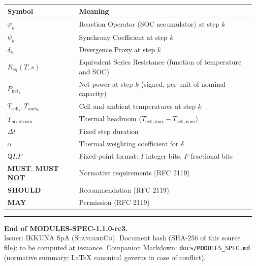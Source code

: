 \documentclass[11pt,letterpaper]{article}
\theoremstyle{definition}
\newcommand{\StandardCo}{\textsc{StandardCo}}
\newcommand{\MUSTNOT}{\textbf{MUST NOT}}
\newcommand{\Qfmt}[2]{\ensuremath{\mathsf{Q}#1.#2}}   %
\newcommand{\ph}{\varphi}       %
\newcommand{\sy}{\psi}          %
\newcommand{\dv}{\delta}        %
\newcommand{\Req}{R_{\mathrm{eq}}}
\newcommand{\Pnet}{P_{\mathrm{net}}}
\newcommand{\Tcell}{T_{\mathrm{cell}}}
\newcommand{\Tamb}{T_{\mathrm{amb}}}
\newcommand{\Thead}{T_{\mathrm{headroom}}}
\newcommand{\Dt}{\Delta t}
\begin{document}
\begin{center}
\begin{tabular}{ll}
\toprule
\textbf{Symbol} & \textbf{Meaning} \\
\midrule
$\ph_k$ & Reaction Operator (SOC accumulator) at step $k$ \\
$\sy_k$ & Synchrony Coefficient at step $k$ \\
$\dv_k$ & Divergence Proxy at step $k$ \\
$\Req(T, s)$ & Equivalent Series Resistance (function of temperature and SOC) \\
$\Pnet_k$ & Net power at step $k$ (signed, per-unit of nominal capacity) \\
$\Tcell_k, \Tamb_k$ & Cell and ambient temperatures at step $k$ \\
$\Thead$ & Thermal headroom ($T_{\mathrm{cell,max}} - T_{\mathrm{cell,nom}}$) \\
$\Dt$ & Fixed step duration \\
$\alpha$ & Thermal weighting coefficient for $\dv$ \\
$\Qfmt{I}{F}$ & Fixed-point format: $I$ integer bits, $F$ fractional bits \\
\textbf{MUST}, \MUSTNOT & Normative requirements (RFC 2119) \\
\textbf{SHOULD} & Recommendation (RFC 2119) \\
\textbf{MAY} & Permission (RFC 2119) \\
\bottomrule
\end{tabular}
\end{center}

\vspace{1cm}
\hrule
\vspace{0.5cm}
\noindent\small{\textbf{End of MODULES-SPEC-1.1.0-rc3.}\\
Issuer: IKKUNA SpA (\StandardCo). Document hash (SHA-256 of this source file): to be computed at issuance. Companion Markdown: \texttt{docs/MODULES\_SPEC.md} (normative summary; LaTeX canonical governs in case of conflict).}
\end{document}
